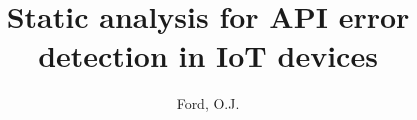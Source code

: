 \documentclass{article}
\title{Static analysis for API error detection in IoT devices}
\author{Ford, O.J.}
\begin{document}




\begin{spacing}{0.8}
\tableofcontents
\end{spacing}
\clearpage


\begin{spacing}{1.4}






\end{spacing}

\printbibliography
\end{document}
